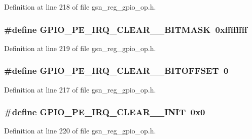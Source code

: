Definition at line 218 of file gsn\_\-reg\_\-gpio\_\-op.h.

\hypertarget{a00553_a22c7fca1e199d55d5dd87e368bc64a80}{
\subsubsection[{GPIO\_\-PE\_\-IRQ\_\-CLEAR\_\-0\_\-BITMASK}]{\setlength{\rightskip}{0pt plus 5cm}\#define GPIO\_\-PE\_\-IRQ\_\-CLEAR\_\_\-BITMASK~0xffffffff}}
\label{a00553_a22c7fca1e199d55d5dd87e368bc64a80}


Definition at line 219 of file gsn\_\-reg\_\-gpio\_\-op.h.

\hypertarget{a00553_a2e8a8a33e6d9f1f2e9fec575e4bba0f7}{
\subsubsection[{GPIO\_\-PE\_\-IRQ\_\-CLEAR\_\-0\_\-BITOFFSET}]{\setlength{\rightskip}{0pt plus 5cm}\#define GPIO\_\-PE\_\-IRQ\_\-CLEAR\_\_\-BITOFFSET~0}}
\label{a00553_a2e8a8a33e6d9f1f2e9fec575e4bba0f7}


Definition at line 217 of file gsn\_\-reg\_\-gpio\_\-op.h.

\hypertarget{a00553_a157ca7bf58e28c816e92f3bb01b5f8e2}{
\subsubsection[{GPIO\_\-PE\_\-IRQ\_\-CLEAR\_\-0\_\-INIT}]{\setlength{\rightskip}{0pt plus 5cm}\#define GPIO\_\-PE\_\-IRQ\_\-CLEAR\_\_\-INIT~0x0}}
\label{a00553_a157ca7bf58e28c816e92f3bb01b5f8e2}


Definition at line 220 of file gsn\_\-reg\_\-gpio\_\-op.h.

